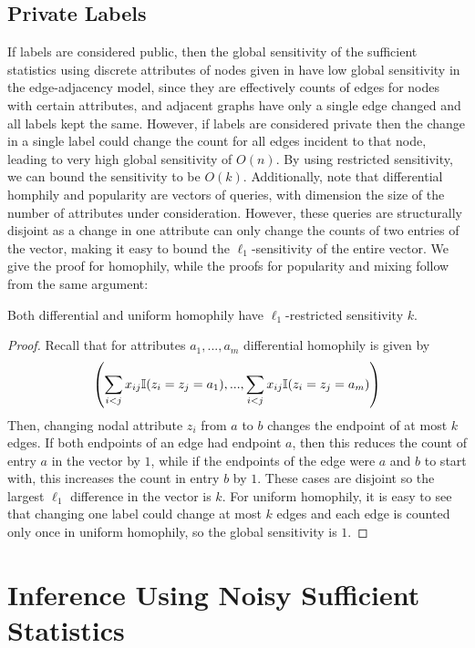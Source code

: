 \subsection{Private Labels}

If labels are considered public, then the global sensitivity of the sufficient statistics using discrete attributes of nodes given in  have low global sensitivity in the edge-adjacency model, since they are effectively counts of edges for nodes with certain attributes, and adjacent graphs have only a single edge changed and all labels kept the same. However, if labels are considered private then the change in a single label could change the count for all edges incident to that node, leading to very high global sensitivity of $O(n)$. By using restricted sensitivity, we can bound the sensitivity to be $O(k)$. Additionally, note that differential homphily and popularity are vectors of queries, with dimension the size of the number of attributes under consideration. However, these queries are structurally disjoint as a change in one attribute can only change the counts of two entries of the vector, making it easy to bound the $\ell_1$-sensitivity of the entire vector. We give the proof for homophily, while the proofs for popularity and mixing follow from the same argument:

\begin{claim}
	Both differential and uniform homophily have $\ell_1$-restricted sensitivity $k$.
\end{claim}
\begin{proof}
Recall that for attributes $a_1,...,a_m$ differential homophily is given by  
$$\left(\sum\limits_{i < j} x_{ij} \mathbb{I} (z_i = z_j = a_1),..., \sum\limits_{i < j} x_{ij} \mathbb{I} (z_i = z_j = a_m)\right)$$
 Then, changing nodal attribute $z_i$ from $a$ to $b$ changes the endpoint of at most $k$ edges. If both endpoints of an edge had endpoint $a$, then this reduces the count of entry $a$ in the vector by $1$, while if the endpoints of the edge were $a$ and $b$ to start with, this increases the count in entry $b$ by $1$. These cases are disjoint so the largest $\ell_1$ difference in the vector is $k$.  For uniform homophily, it is easy to see that changing one label could change at most $k$ edges and each edge is counted only once in uniform homophily, so the global sensitivity is $1$.
\end{proof}

\section{Inference Using Noisy Sufficient Statistics}

